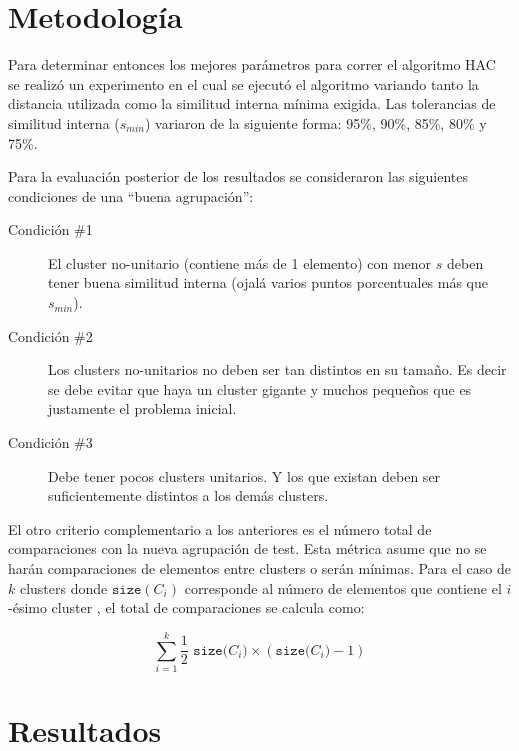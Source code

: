 \section{Metodología}

\par Para determinar entonces los mejores parámetros para correr el algoritmo HAC se realizó un experimento en el cual se ejecutó el algoritmo variando tanto la distancia utilizada como la similitud interna mínima exigida. Las tolerancias de similitud interna ($s_{min}$) variaron de la siguiente forma: 95\%, 90\%, 85\%, 80\% y 75\%.

\par Para la evaluación posterior de los resultados se consideraron las siguientes condiciones de una ``buena agrupación'':
\begin{description}
\item[Condición \#1] El cluster no-unitario (contiene más de 1 elemento) con menor $s$ deben tener buena similitud interna (ojalá varios puntos porcentuales más que $s_{min}$).
\item[Condición \#2] Los clusters no-unitarios no deben ser tan distintos en su tamaño. Es decir se debe evitar que haya un cluster gigante y muchos pequeños que es justamente el problema inicial.
\item[Condición \#3] Debe tener pocos clusters unitarios. Y los que existan deben ser suficientemente distintos a los demás clusters.
\end{description}

\par El otro criterio complementario a los anteriores es el número total de comparaciones con la nueva agrupación de test. Esta métrica asume que no se harán comparaciones de elementos entre clusters o serán mínimas. Para el caso de $k$ clusters donde $\texttt{size}(C_i)$ corresponde al número de elementos que contiene el $i$-ésimo cluster , el total de comparaciones se calcula como:


   \[ \sum_{i=1}^{k} \frac{1}{2} \,\, \texttt{size(}C_i\texttt{)} \times \left( \texttt{size(}C_i\texttt{)} -1 \right) \]


\section{Resultados}

